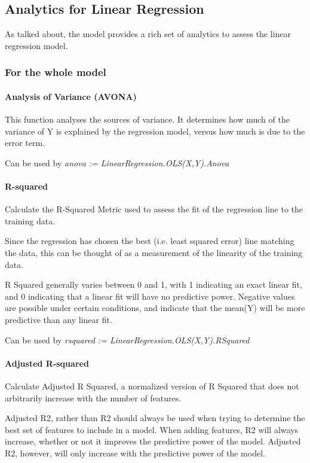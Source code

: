 \documentclass[a4paper,oneside,12pt]{book}
\begin{document}
\subsection{Analytics for Linear Regression}

As talked about, the model provides a rich set of analytics to assess the linear regression model. 

\subsubsection{For the whole model}

\paragraph{Analysis of Variance (AVONA)}

This function analyses the sources of variance. It determines how much of the variance of Y is explained by the regression model, versus how much is due to the error term.

Can be used by \textit{anova := LinearRegression.OLS(X,Y).Anova}

\paragraph{R-squared}

Calculate the R-Squared Metric used to assess the fit of the regression line to the training data.

Since the regression has chosen the best (i.e. least squared error) line matching the data, this can be thought of as a measurement of the linearity of the training data.

R Squared generally varies between 0 and 1, with 1 indicating an exact linear fit, and 0 indicating that a linear fit will have no predictive power. Negative values are possible under certain conditions, and indicate that the mean(Y) will be more predictive than any linear fit.

Can be used by \textit{rsquared := LinearRegression.OLS(X,Y).RSquared}

\paragraph{Adjusted R-squared}

Calculate Adjusted R Squared, a normalized version of R Squared that does not arbitrarily increase with the number of features.

Adjusted R2, rather than R2 should always be used when trying to determine the best set of features to include in a model. When adding features, R2 will always increase, whether or not it improves the predictive power of the model. Adjusted R2, however, will only increase with the predictive power of the model.
\end{document}
